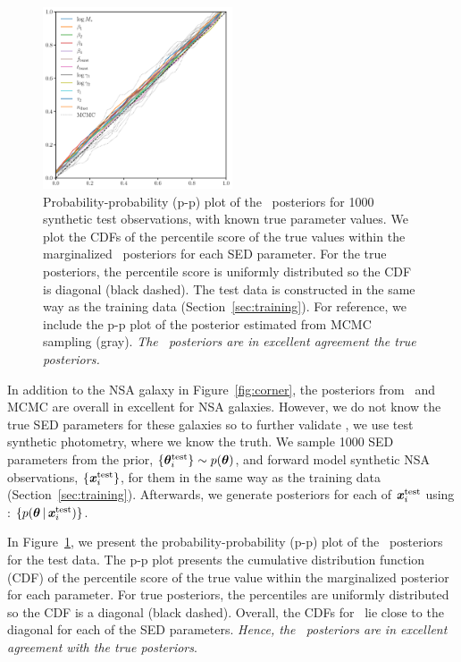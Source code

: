 \begin{figure}
\begin{center}
    \includegraphics[width=0.5\textwidth]{figs/ppplot.pdf}
    \caption{\label{fig:pp}
    Probability-probability (p-p) plot of the \sedflow~posteriors for 1000
    synthetic test observations, with known true parameter values. 
    We plot the CDFs of the percentile score of the true values within the
    marginalized \sedflow~posteriors for each SED parameter.
    For the true posteriors, the percentile score is uniformly distributed so
    the CDF is diagonal (black dashed).
    The test data is constructed in the same way as the training data
    (Section~\ref{sec:training}). 
    For reference, we include the p-p plot of the posterior estimated from MCMC
    sampling (gray). 
    \emph{The \sedflow~posteriors are in excellent agreement the true
    posteriors.}
    }
\end{center}
\end{figure}
In addition to the NSA galaxy in Figure~\ref{fig:corner}, the posteriors from
\sedflow~and MCMC are overall in excellent for NSA galaxies.
However, we do not know the true SED parameters for these galaxies so to
further validate \sedflow, we use test synthetic photometry, where we know the
truth.
We sample 1000 SED parameters from the prior,
$\{\boldsymbol{\theta}^{\rm test}_i\} \sim p(\boldsymbol{\theta})$, 
and forward model synthetic NSA observations, 
$\{\textbf{\textit{x}}^{\rm test}_i\}$, 
for them in the same way as the training data (Section~\ref{sec:training}). 
Afterwards, we generate posteriors for each of $\textbf{\textit{x}}^{\rm test}_i$ using 
\sedflow: $\{ p(\boldsymbol{\theta} \,|\, \textbf{\textit{x}}^{\rm test}_i)\}$. 

In Figure~\ref{fig:pp}, we present the probability-probability (p-p) plot of
the \sedflow~posteriors for the test data. 
The p-p plot presents the cumulative distribution function (CDF) of the
percentile score of the true value within the marginalized posterior for each
parameter. 
For true posteriors, the percentiles are uniformly distributed so the CDF is a
diagonal (black dashed).
Overall, the CDFs for \sedflow~lie close to the diagonal for each of the SED
parameters. 
\emph{Hence, the \sedflow~posteriors are in excellent agreement with the true
posteriors}.

